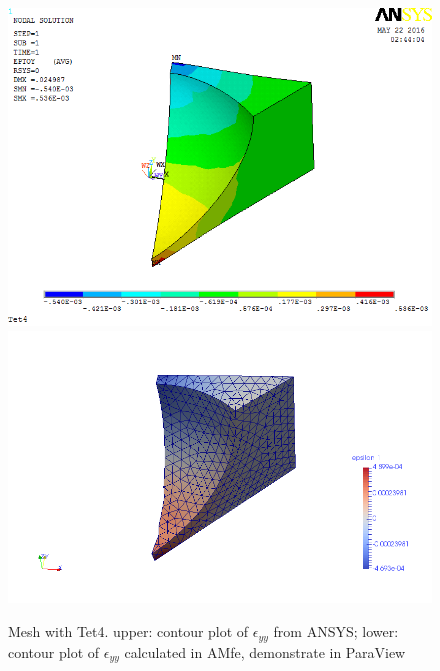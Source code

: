 \begin{figure}[htbp]
	\begin{center}
		\includegraphics[width=13cm,clip]{Tet4Eyy.png} 		
		\includegraphics[width=13cm,clip]{Tet4EyyP.png} 		
		\caption{Mesh with Tet4. upper: contour plot of $\epsilon_{yy}$ from ANSYS; lower: contour plot of $\epsilon_{yy}$ calculated in AMfe, demonstrate in ParaView} \label{fig: Tet4Eyy}
	\end{center}
\end{figure}
\clearpage 

